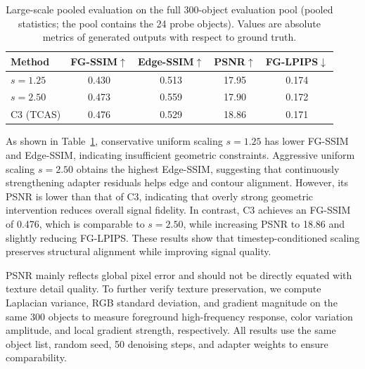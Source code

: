 \documentclass[times,twocolumn,final]{elsarticle}
\begin{document}
\begin{table}[t]
\centering
\caption{Large-scale pooled evaluation on the full 300-object evaluation pool (pooled statistics; the pool contains the 24 probe objects). Values are absolute metrics of generated outputs with respect to ground truth.}
\label{tab:300obj}
\small\setlength{\tabcolsep}{4pt}
\begin{tabular}{lcccc}
\toprule
Method & FG-SSIM$\uparrow$ & Edge-SSIM$\uparrow$ & PSNR$\uparrow$ & FG-LPIPS$\downarrow$ \\
\midrule
$s = 1.25$ & 0.430 & 0.513 & 17.95 & 0.174 \\
$s = 2.50$ & 0.473 & 0.559 & 17.90 & 0.172 \\
C3 (TCAS) & 0.476 & 0.529 & 18.86 & 0.171 \\
\bottomrule
\end{tabular}
\end{table}


As shown in Table~\ref{tab:300obj}, conservative uniform scaling $s = 1.25$ has lower FG-SSIM and Edge-SSIM, indicating insufficient geometric constraints. Aggressive uniform scaling $s = 2.50$ obtains the highest Edge-SSIM, suggesting that continuously strengthening adapter residuals helps edge and contour alignment. However, its PSNR is lower than that of C3, indicating that overly strong geometric intervention reduces overall signal fidelity. In contrast, C3 achieves an FG-SSIM of 0.476, which is comparable to $s = 2.50$, while increasing PSNR to 18.86 and slightly reducing FG-LPIPS. These results show that timestep-conditioned scaling preserves structural alignment while improving signal quality.

PSNR mainly reflects global pixel error and should not be directly equated with texture detail quality. To further verify texture preservation, we compute Laplacian variance, RGB standard deviation, and gradient magnitude on the same 300 objects to measure foreground high-frequency response, color variation amplitude, and local gradient strength, respectively. All results use the same object list, random seed, 50 denoising steps, and adapter weights to ensure comparability.
\end{document}
